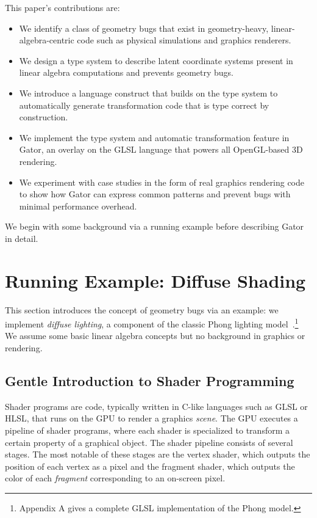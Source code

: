 \documentclass[../main.tex]{subfiles}
\begin{document}
	This paper's contributions are:
	\begin{itemize}
		\item We identify a class of geometry bugs that exist in geometry-heavy, linear-algebra-centric code such as physical simulations and graphics renderers.
		\item We design a type system to describe latent coordinate systems present in linear algebra computations and prevents geometry bugs.
		\item We introduce a language construct that builds on the type system to automatically generate transformation code that is type correct by construction.
		\item We implement the type system and automatic transformation feature in Gator, an overlay on the GLSL language that powers all OpenGL-based 3D rendering.
		\item We experiment with case studies in the form of real graphics rendering code to show how Gator can express common patterns and prevent bugs with minimal performance overhead.
	\end{itemize}
	We begin with some background via a running example
	before describing Gator in detail.
	
	
	\section{Running Example: Diffuse Shading}
	\label{sec:example}
	
	This section introduces the concept of geometry bugs via an example:
	we implement \emph{diffuse lighting}, a component of the classic Phong lighting model~\cite{phong}.\footnote{Appendix A gives a complete GLSL implementation of the Phong model.}
	We assume some basic linear algebra concepts but no background in graphics or rendering.
	
	\subsection{Gentle Introduction to Shader Programming}
	Shader programs are code, typically written in C-like languages such as GLSL or HLSL, that runs on the GPU to render a graphics \emph{scene}. The GPU executes a pipeline of shader programs, where each shader is specialized to transform a certain property of a graphical object.  The shader pipeline consists of several stages.  The most notable of these stages are the vertex shader, which outputs the position of each vertex as a pixel and the fragment shader, which outputs the color of each \emph{fragment} corresponding to an on-screen pixel.
	
\end{document}
